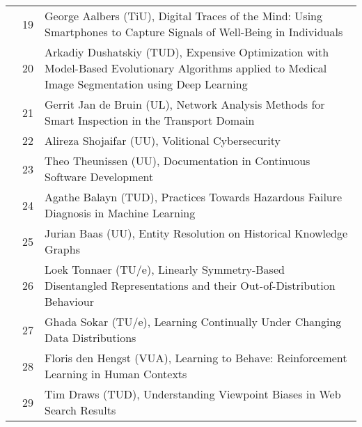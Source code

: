 \begin{xltabular}{\linewidth}{@{} l @{\hspace{0.5em}} l @{\hspace{1em}} X @{}}
	&	 19	&	George Aalbers (TiU), Digital Traces of the Mind: Using Smartphones to Capture Signals of Well-Being in Individuals \\
	&	 20	&	Arkadiy Dushatskiy (TUD), Expensive Optimization with Model-Based Evolutionary Algorithms applied to Medical Image Segmentation using Deep Learning \\
	&	 21	&	Gerrit Jan de Bruin (UL), Network Analysis Methods for Smart Inspection in the Transport Domain \\
	&	 22	&	Alireza Shojaifar (UU), Volitional Cybersecurity \\
	&	 23	&	Theo Theunissen (UU), Documentation in Continuous Software Development \\
	&	 24	&	Agathe Balayn (TUD), Practices Towards Hazardous Failure Diagnosis in Machine Learning \\
	&	 25	&	Jurian Baas (UU), Entity Resolution on Historical Knowledge Graphs \\
	&	 26	&	Loek Tonnaer (TU/e), Linearly Symmetry-Based Disentangled Representations and their Out-of-Distribution Behaviour \\
	&	 27	&	Ghada Sokar (TU/e), Learning Continually Under Changing Data Distributions \\
	&	 28	&	Floris den Hengst (VUA), Learning to Behave: Reinforcement Learning in Human Contexts \\
	&	 29	&	Tim Draws (TUD), Understanding Viewpoint Biases in Web Search Results \\


\end{xltabular}
